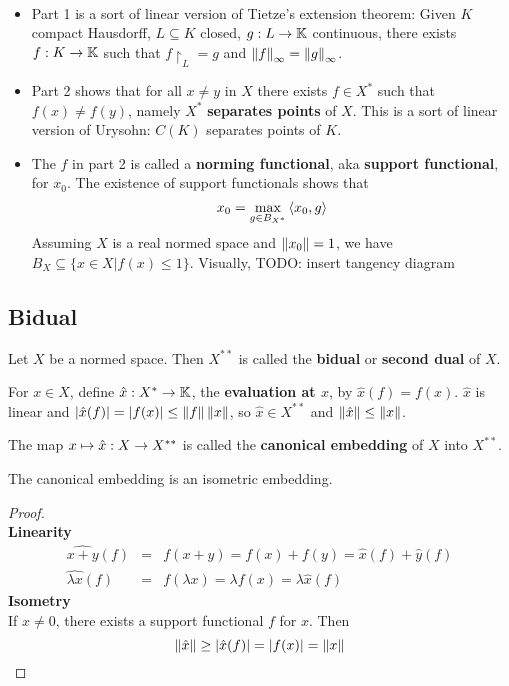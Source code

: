 \documentclass{article}
\begin{document}
\begin{rmks}~
  \begin{itemize}
    \item Part 1 is a sort of linear version of Tietze's extension theorem: Given $K$ compact Hausdorff, $L \subseteq K$ closed, $g : L \rightarrow \mathbb K$ continuous, there exists $f : K \rightarrow \mathbb K$ such that $f\restriction_L = g$ and $\left\lVert f\right\rVert_\infty = \left\lVert g\right\rVert_\infty$.
    \item Part 2 shows that for all $x \ne y$ in $X$ there exists $f \in X^*$ such that $f(x) \ne f(y)$, namely $X^*$ {\bf separates points} of $X$. This is a sort of linear version of Urysohn: $C(K)$ separates points of $K$.
    \item The $f$ in part 2 is called a {\bf norming functional}, aka {\bf support functional}, for $x_0$. The existence of support functionals shows that
      $$x_0 = \max_{g \in B_{X^*}} \left\langle x_0, g\right\rangle$$
      Assuming $X$ is a real normed space and $\left\lVert x_0\right\rVert = 1$, we have $B_X \subseteq \{x \in X| f(x) \le 1\}$. Visually, TODO: insert tangency diagram
  \end{itemize}
\end{rmks}

\subsection{Bidual}

Let $X$ be a normed space. Then $X^{**}$ is called the {\bf bidual} or {\bf second dual} of $X$.

For $x \in X$, define $\hat x : X^* \rightarrow \mathbb K$, the {\bf evaluation at $x$}, by $\hat x(f) = f(x)$. $\hat x$ is linear and $|\hat x(f)| = |f(x)| \le \left\lVert f\right\rVert \left\lVert x\right\rVert$, so $\hat x \in X^{**}$ and $\left\lVert \hat x\right\rVert \le \left\lVert x\right\rVert$.

The map $x \mapsto \hat x : X \rightarrow X^{**}$ is called the {\bf canonical embedding} of $X$ into $X^{**}$.

\begin{nthm}\label{thm:can-emb}
  The canonical embedding is an isometric embedding.
\end{nthm}
\begin{proof}~\\
  {\bf Linearity}
  \begin{eqnarray*}
    \widehat{x + y}(f) & = & f(x + y) = f(x) + f(y) = \hat x(f) + \hat y(f) \\
    \widehat{\lambda x}(f) & = & f(\lambda x) = \lambda f(x) = \lambda \hat x(f)
  \end{eqnarray*}
  {\bf Isometry} \\
  If $x \ne 0$, there exists a support functional $f$ for $x$. Then
  $$ \left\lVert \hat x\right\rVert \ge |\hat x(f)| = |f(x)| = \left\lVert x\right\rVert$$
\end{proof}
\end{document}
